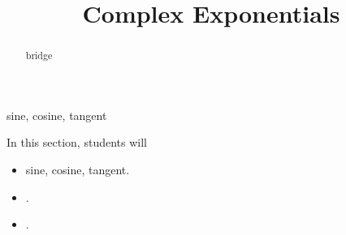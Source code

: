 \documentclass{ximera}
\title{Complex Exponentials}
\begin{document}
\begin{abstract}
bridge
\end{abstract}
\maketitle




sine, cosine, tangent

\begin{sectionOutcomes}
In this section, students will 

\begin{itemize}
\item sine, cosine, tangent.
\item .
\item .
\end{itemize}
\end{sectionOutcomes}
\end{document}
